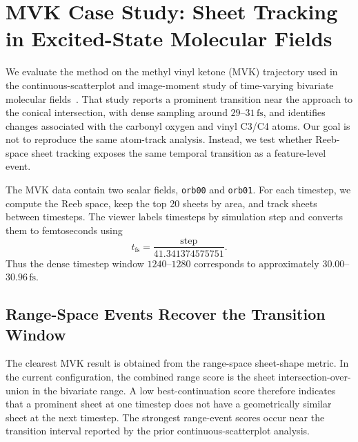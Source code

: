 \section{MVK Case Study: Sheet Tracking in Excited-State Molecular Fields}
\label{sec:results-mvk}

We evaluate the method on the methyl vinyl ketone (MVK) trajectory used in the
continuous-scatterplot and image-moment study of time-varying bivariate
molecular fields~\cite{cspImageMomentsMVK}. That study reports a prominent
transition near the approach to the conical intersection, with dense sampling
around \(29\)--\(31\,\mathrm{fs}\), and identifies changes associated with the
carbonyl oxygen and vinyl C3/C4 atoms. Our goal is not to reproduce the same
atom-track analysis. Instead, we test whether Reeb-space sheet tracking exposes
the same temporal transition as a feature-level event.

The MVK data contain two scalar fields, \texttt{orb00} and \texttt{orb01}. For
each timestep, we compute the Reeb space, keep the top 20 sheets by area, and
track sheets between timesteps. The viewer labels timesteps by simulation step
and converts them to femtoseconds using
\[
  t_{\mathrm{fs}} = \frac{\mathrm{step}}{41.341374575751}.
\]
Thus the dense timestep window \(1240\)--\(1280\) corresponds to approximately
\(30.00\)--\(30.96\,\mathrm{fs}\).

\subsection{Range-Space Events Recover the Transition Window}

The clearest MVK result is obtained from the range-space sheet-shape metric. In
the current configuration, the combined range score is the sheet
intersection-over-union in the bivariate range. A low best-continuation score
therefore indicates that a prominent sheet at one timestep does not have a
geometrically similar sheet at the next timestep. The strongest range-event
scores occur near the transition interval reported by the prior
continuous-scatterplot analysis.

